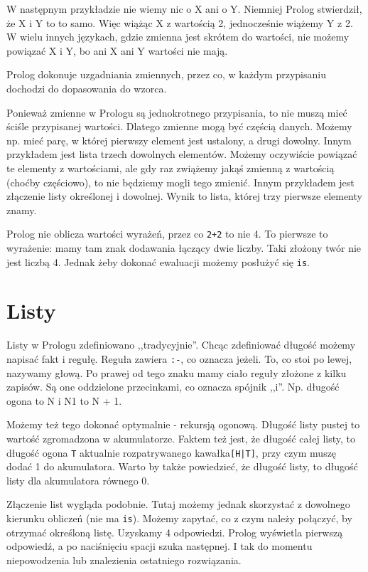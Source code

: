\documentclass[12pt,a4paper]{article}
\begin{document}
W następnym przykładzie nie wiemy nic o X ani o Y. Niemniej Prolog stwierdził, że X i Y to to samo. Więc wiążąc X z wartością 2, jednocześnie wiążemy Y z 2. W wielu innych językach, gdzie zmienna jest skrótem do wartości, nie możemy powiązać X i Y, bo ani X ani Y wartości nie mają.

Prolog dokonuje uzgadniania zmiennych, przez co, w każdym przypisaniu dochodzi do dopasowania do wzorca.

Ponieważ zmienne w Prologu są jednokrotnego przypisania, to nie muszą mieć ściśle przypisanej wartości. Dlatego zmienne mogą być częścią danych. Możemy np. mieć parę, w której pierwszy element jest ustalony, a drugi dowolny. Innym przykładem jest lista trzech dowolnych elementów. Możemy oczywiście powiązać te elementy z wartościami, ale gdy raz zwiążemy jakąś zmienną z wartością (choćby częściowo), to nie będziemy mogli tego zmienić. Innym przykładem jest złączenie listy określonej i dowolnej. Wynik to lista, której trzy pierwsze elementy znamy.

Prolog nie oblicza wartości wyrażeń, przez co \verb!2+2! to nie 4. To pierwsze to wyrażenie: mamy tam znak dodawania łączący dwie liczby. Taki złożony twór nie jest liczbą 4. Jednak żeby dokonać ewaluacji możemy posłużyć się \verb+is+.

\section{Listy}
Listy w Prologu zdefiniowano ,,tradycyjnie''. Chcąc zdefiniować długość możemy napisać fakt i regułę. Reguła zawiera \verb+:-+, co oznacza jeżeli. To, co stoi po lewej, nazywamy głową. Po prawej od tego znaku mamy ciało reguły złożone z kilku zapisów. Są one oddzielone przecinkami, co oznacza spójnik ,,i''. Np. długość ogona to N i N1 to N + 1.

Możemy też tego dokonać optymalnie - rekursją ogonową. Długość listy pustej to wartość zgromadzona w akumulatorze. Faktem też jest, że długość całej listy, to długość ogona \verb+T+ aktualnie rozpatrywanego kawałka\verb+[H|T]+, przy czym muszę dodać 1 do akumulatora. Warto by także powiedzieć, że długość listy, to długość listy dla akumulatora równego 0.

Złączenie list wygląda podobnie. Tutaj możemy jednak skorzystać z dowolnego kierunku obliczeń (nie ma \verb+is+). Możemy zapytać, co z czym należy połączyć, by otrzymać określoną listę. Uzyskamy 4 odpowiedzi. Prolog wyświetla pierwszą odpowiedź, a po naciśnięciu spacji szuka następnej. I tak do momentu niepowodzenia lub znalezienia ostatniego rozwiązania.
\end{document}
